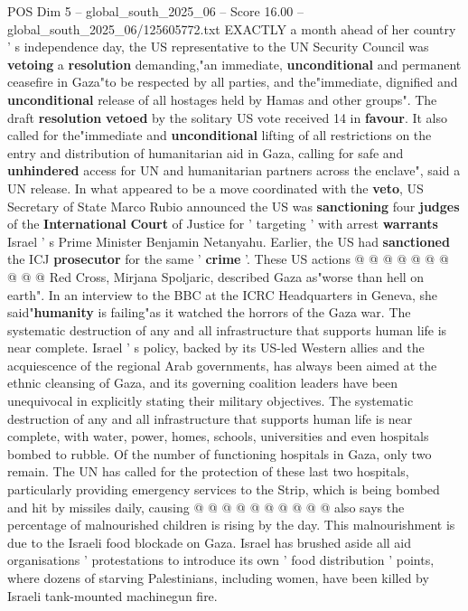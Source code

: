 \begin{textsample}{POS Dim 5 – global\_south\_2025\_06 – Score 16.00 – global\_south\_2025\_06/125605772.txt}  \label{ex:f5_pos_047}
EXACTLY a month ahead of her country ' s independence day, the US representative to the UN Security Council was \textbf{vetoing} a \textbf{resolution} demanding,"an immediate, \textbf{unconditional} and permanent ceasefire in Gaza"to be respected by all parties, and the"immediate, dignified and \textbf{unconditional} release of all hostages held by Hamas and other groups".
The draft \textbf{resolution} \textbf{vetoed} by the solitary US vote received 14 in \textbf{favour}.
It also called for the"immediate and \textbf{unconditional} lifting of all restrictions on the entry and distribution of humanitarian aid in Gaza, calling for safe and \textbf{unhindered} access for UN and humanitarian partners across the enclave", said a UN release.
In what appeared to be a move coordinated with the \textbf{veto}, US Secretary of State Marco Rubio announced the US was \textbf{sanctioning} four \textbf{judges} of the \textbf{International} \textbf{Court} of Justice for ' targeting ' with arrest \textbf{warrants} Israel ' s Prime Minister Benjamin Netanyahu.
Earlier, the US had \textbf{sanctioned} the ICJ \textbf{prosecutor} for the same ' \textbf{crime} '.
These US actions @ @ @ @ @ @ @ @ @ @ Red Cross, Mirjana Spoljaric, described Gaza as"worse than hell on earth".
In an interview to the BBC at the ICRC Headquarters in Geneva, she said"\textbf{humanity} is failing"as it watched the horrors of the Gaza war.
The systematic destruction of any and all infrastructure that supports human life is near complete.
Israel ' s policy, backed by its US-led Western allies and the acquiescence of the regional Arab governments, has always been aimed at the ethnic cleansing of Gaza, and its governing coalition leaders have been unequivocal in explicitly stating their military objectives.
The systematic destruction of any and all infrastructure that supports human life is near complete, with water, power, homes, schools, universities and even hospitals bombed to rubble.
Of the number of functioning hospitals in Gaza, only two remain.
The UN has called for the protection of these last two hospitals, particularly providing emergency services to the Strip, which is being bombed and hit by missiles daily, causing @ @ @ @ @ @ @ @ @ @ also says the percentage of malnourished children is rising by the day.
This malnourishment is due to the Israeli food blockade on Gaza.
Israel has brushed aside all aid organisations ' protestations to introduce its own ' food distribution ' points, where dozens of starving Palestinians, including women, have been killed by Israeli tank-mounted machinegun fire.

\end{textsample}
